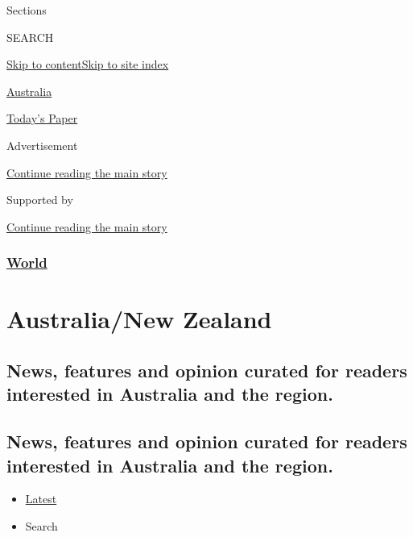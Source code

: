 Sections

SEARCH

\protect\hyperlink{site-content}{Skip to
content}\protect\hyperlink{site-index}{Skip to site index}

\href{https://www.nytimes.com/section/world/australia}{Australia}

\href{https://myaccount.nytimes.com/auth/login?response_type=cookie\&client_id=vi}{}

\href{https://www.nytimes.com/section/todayspaper}{Today's Paper}

Advertisement

\protect\hyperlink{after-top}{Continue reading the main story}

Supported by

\protect\hyperlink{after-sponsor}{Continue reading the main story}

\hypertarget{world}{%
\subsubsection{\texorpdfstring{\href{/section/world}{World}}{World}}\label{world}}

\hypertarget{australianew-zealand}{%
\section{Australia/New Zealand}\label{australianew-zealand}}

\hypertarget{news-features-and-opinion-curated-for-readers-interested-in-australia-and-the-region}{%
\subsection{News, features and opinion curated for readers interested in
Australia and the
region.}\label{news-features-and-opinion-curated-for-readers-interested-in-australia-and-the-region}}

\hypertarget{news-features-and-opinion-curated-for-readers-interested-in-australia-and-the-region-1}{%
\subsection{News, features and opinion curated for readers interested in
Australia and the
region.}\label{news-features-and-opinion-curated-for-readers-interested-in-australia-and-the-region-1}}

\begin{itemize}
\tightlist
\item
  \protect\hyperlink{stream-panel}{Latest}
\item
  Search
\end{itemize}

